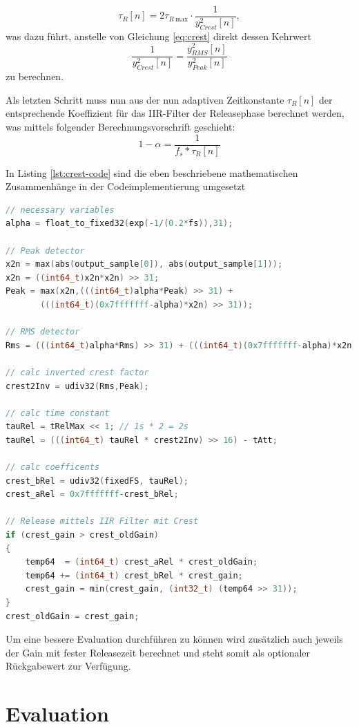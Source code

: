 \documentclass[paper=a4, fontsize=12pt]{scrartcl}
\numberwithin{equation}{section}		%
\numberwithin{figure}{section}			%
\numberwithin{table}{section}				%
\begin{document}
\begin{equation}
	\tau_R[n] = 2\tau_{R~\text{max}} \cdot \frac{1}{y^2_{Crest}[n]},
\end{equation} 
was dazu führt, anstelle von Gleichung \ref{eq:crest} direkt dessen Kehrwert
$$\frac{1}{y^2_{Crest}[n]} = \frac{y^2_{RMS}[n]}{y^2_{Peak}[n]}$$
zu berechnen.

Als letzten Schritt muss nun aus der nun adaptiven Zeitkonstante $\tau_R[n]$ der entsprechende Koeffizient für das IIR-Filter der Releasephase berechnet werden, was mittels folgender Berechnungsvorschrift geschieht:
$$1-\alpha = \frac{1}{f_s*\tau_R[n]}$$

In Listing \ref{lst:crest-code} sind die eben beschriebene mathematischen Zusammenhänge in der Codeimplementierung umgesetzt

\begin{lstlisting}[language=C++, label=lst:crest-code, caption={Darstellung des für die Crestfaktorberechnug relevanten Codes}]
// necessary variables
alpha = float_to_fixed32(exp(-1/(0.2*fs)),31);

// Peak detector
x2n = max(abs(output_sample[0]), abs(output_sample[1]));
x2n = ((int64_t)x2n*x2n) >> 31;
Peak = max(x2n,(((int64_t)alpha*Peak) >> 31) + 
	   (((int64_t)(0x7fffffff-alpha)*x2n) >> 31));
	   
// RMS detector
Rms = (((int64_t)alpha*Rms) >> 31) + (((int64_t)(0x7fffffff-alpha)*x2n) >> 31);

// calc inverted crest factor
crest2Inv = udiv32(Rms,Peak);

// calc time constant
tauRel = tRelMax << 1; // 1s * 2 = 2s
tauRel = (((int64_t) tauRel * crest2Inv) >> 16) - tAtt;

// calc coefficents
crest_bRel = udiv32(fixedFS, tauRel);
crest_aRel = 0x7fffffff-crest_bRel;

// Release mittels IIR Filter mit Crest
if (crest_gain > crest_oldGain)
{
    temp64  = (int64_t) crest_aRel * crest_oldGain;
    temp64 += (int64_t) crest_bRel * crest_gain;
    crest_gain = min(crest_gain, (int32_t) (temp64 >> 31));
}
crest_oldGain = crest_gain;	
\end{lstlisting}

Um eine bessere Evaluation durchführen zu können wird zusätzlich auch jeweils der Gain mit fester Releasezeit berechnet und steht somit  als optionaler Rückgabewert zur Verfügung. 

\section{Evaluation}
\end{document}
